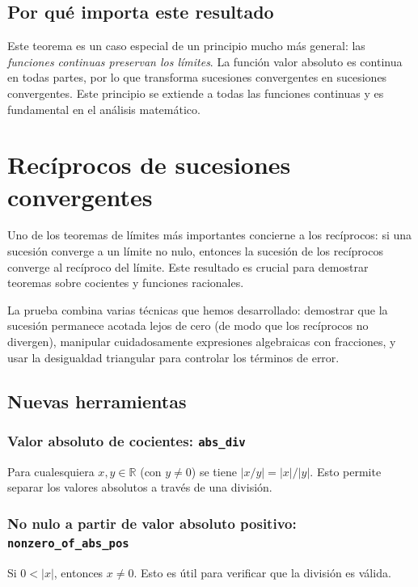 \subsection{Por qué importa este resultado}

Este teorema es un caso especial de un principio mucho más general: las
\emph{funciones continuas preservan los límites}. La función valor absoluto
es continua en todas partes, por lo que transforma sucesiones convergentes en
sucesiones convergentes. Este principio se extiende a todas las funciones
continuas y es fundamental en el análisis matemático.

\section{Recíprocos de sucesiones convergentes}

Uno de los teoremas de límites más importantes concierne a los recíprocos: si
una sucesión converge a un límite no nulo, entonces la sucesión de los
recíprocos converge al recíproco del límite. Este resultado es crucial para
demostrar teoremas sobre cocientes y funciones racionales.

La prueba combina varias técnicas que hemos desarrollado: demostrar que la
sucesión permanece acotada lejos de cero (de modo que los recíprocos no
divergen), manipular cuidadosamente expresiones algebraicas con fracciones, y
usar la desigualdad triangular para controlar los términos de error.

\subsection{Nuevas herramientas}

\subsubsection{Valor absoluto de cocientes: \texttt{abs\_div}}

Para cualesquiera $x, y \in \mathbb{R}$ (con $y \neq 0$) se tiene
$|x/y| = |x|/|y|$. Esto permite separar los valores absolutos a través de
una división.

\subsubsection{No nulo a partir de valor absoluto positivo: \texttt{nonzero\_of\_abs\_pos}}

Si $0 < |x|$, entonces $x \neq 0$. Esto es útil para verificar que la
división es válida.

